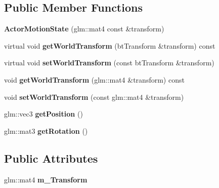 \subsection*{Public Member Functions}
\begin{DoxyCompactItemize}
\item 
\mbox{\label{classTarbora_1_1ActorMotionState_a9f0f8dfe3b52a74c0dff5196629f28c9}} 
{\bfseries Actor\+Motion\+State} (glm\+::mat4 const \&transform)
\item 
\mbox{\label{classTarbora_1_1ActorMotionState_a6ca1b1961e95b7469e9dbef6d32f38e4}} 
virtual void {\bfseries get\+World\+Transform} (bt\+Transform \&transform) const
\item 
\mbox{\label{classTarbora_1_1ActorMotionState_a116151bb38d94aede50f35841bb03e6b}} 
virtual void {\bfseries set\+World\+Transform} (const bt\+Transform \&transform)
\item 
\mbox{\label{classTarbora_1_1ActorMotionState_aebdbbe65dc6e5b8826cc500baf5f0318}} 
void {\bfseries get\+World\+Transform} (glm\+::mat4 \&transform) const
\item 
\mbox{\label{classTarbora_1_1ActorMotionState_ac39c57708b091d92a0812f9cda68e7bb}} 
void {\bfseries set\+World\+Transform} (const glm\+::mat4 \&transform)
\item 
\mbox{\label{classTarbora_1_1ActorMotionState_ab79ee121003e3adda3c77c210dadc058}} 
glm\+::vec3 {\bfseries get\+Position} ()
\item 
\mbox{\label{classTarbora_1_1ActorMotionState_af57e028d47be8d142a01c61c25952eb0}} 
glm\+::mat3 {\bfseries get\+Rotation} ()
\end{DoxyCompactItemize}
\subsection*{Public Attributes}
\begin{DoxyCompactItemize}
\item 
\mbox{\label{classTarbora_1_1ActorMotionState_a89476c358757187de24d4917f4986b93}} 
glm\+::mat4 {\bfseries m\+\_\+\+Transform}
\end{DoxyCompactItemize}


